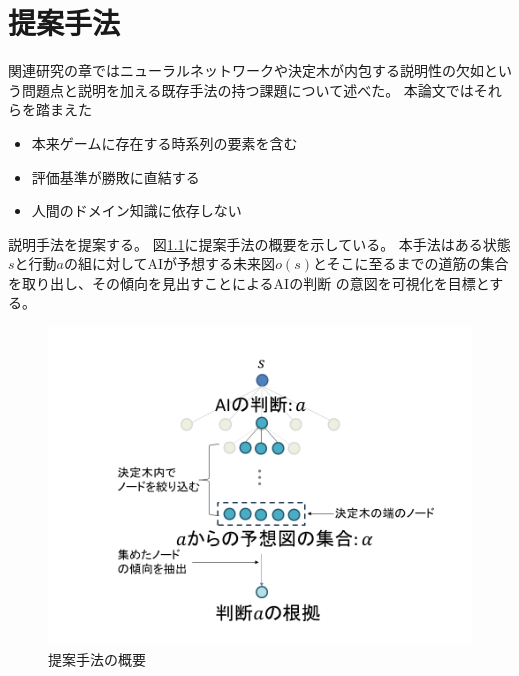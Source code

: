 \chapter{提案手法}
関連研究の章ではニューラルネットワークや決定木が内包する説明性の欠如という問題点と説明を加える既存手法の持つ課題について述べた。
本論文ではそれらを踏まえた
\begin{itemize}
	\item 本来ゲームに存在する時系列の要素を含む
	\item 評価基準が勝敗に直結する
    \item 人間のドメイン知識に依存しない
\end{itemize}
説明手法を提案する。
図\ref{fig:mabs}に提案手法の概要を示している。
本手法はある状態$s$と行動$a$の組に対してAIが予想する未来図$o(s)$とそこに至るまでの道筋の集合を取り出し、その傾向を見出すことによるAIの判断
の意図を可視化を目標とする。
\begin{figure}[t]
    \centering
    \includegraphics[width=\linewidth]{./figure/mabs.png}
    \caption{提案手法の概要}
    \label{fig:mabs}
\end{figure}


